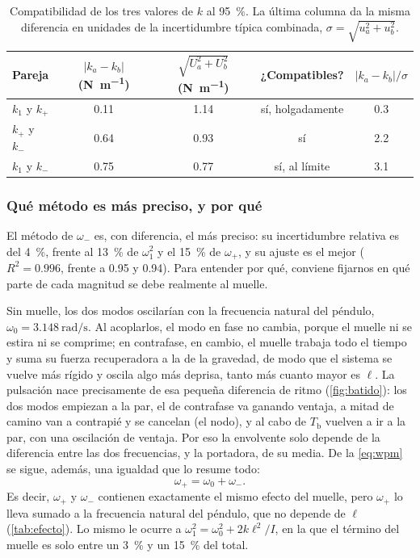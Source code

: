 \documentclass[a4paper,11pt]{amsart}
\numberwithin{equation}{section}
\newcommand{\Tb}{T_{\mathrm{b}}}              %
\newcommand{\wz}{\omega_0}                    %
\newcommand{\wu}{\omega_1}                    %
\newcommand{\wm}{\omega_{-}}                  %
\newcommand{\wpl}{\omega_{+}}                 %
\theoremstyle{cienplano}
\theoremstyle{ciendef}
\theoremstyle{cienobs}
\begin{document}
\begin{table}[ht]
\centering
\caption{Compatibilidad de los tres valores de $k$ al \SI{95}{\percent}. La
última columna da la misma diferencia en unidades de la incertidumbre típica
combinada, $\sigma=\sqrt{u_a^{2}+u_b^{2}}$.}
\label{tab:compatibilidad}
\renewcommand{\arraystretch}{1.25}
\begin{tabular}{@{}l c c c c@{}}
\toprule
Pareja & $|k_a-k_b|$ (\si{\newton\per\meter}) & $\sqrt{U_a^{2}+U_b^{2}}$ (\si{\newton\per\meter}) & ¿Compatibles? & $|k_a-k_b|/\sigma$ \\
\midrule
$k_{1}$ y $k_{+}$ & \num{0,11} & \num{1,14} & sí, holgadamente & \num{0,3} \\
$k_{+}$ y $k_{-}$ & \num{0,64} & \num{0,93} & sí              & \num{2,2} \\
$k_{1}$ y $k_{-}$ & \num{0,75} & \num{0,77} & sí, al límite    & \num{3,1} \\
\bottomrule
\end{tabular}
\end{table}

\subsubsection{Qué método es más preciso, y por qué}
El método de $\wm$ es, con diferencia, el más preciso: su incertidumbre
relativa es del \SI{4}{\percent}, frente al \SI{13}{\percent} de $\wu^{2}$ y el
\SI{15}{\percent} de $\wpl$, y su ajuste es el mejor ($R^{2}=\num{0,996}$,
frente a \num{0,95} y \num{0,94}). Para entender por qué, conviene fijarnos en
qué parte de cada magnitud se debe realmente al muelle.

Sin muelle, los dos modos oscilarían con la frecuencia natural del péndulo,
$\wz=\SI{3,148}{\radian\per\second}$. Al acoplarlos, el modo en fase no cambia,
porque el muelle ni se estira ni se comprime; en contrafase, en cambio, el
muelle trabaja todo el tiempo y suma su fuerza recuperadora a la de la
gravedad, de modo que el sistema se vuelve más rígido y oscila algo más
deprisa, tanto más cuanto mayor es $\ell$. La pulsación nace precisamente de
esa pequeña diferencia de ritmo (\cref{fig:batido}): los dos modos empiezan a
la par, el de contrafase va ganando ventaja, a mitad de camino van a contrapié
y se cancelan (el nodo), y al cabo de $\Tb$ vuelven a ir a la par, con una
oscilación de ventaja. Por eso la envolvente solo depende de la diferencia
entre las dos frecuencias, y la portadora, de su media. De la \cref{eq:wpm} se
sigue, además, una igualdad que lo resume todo:
\begin{equation}\label{eq:wmaswmenos}
  \wpl=\wz+\wm .
\end{equation}
Es decir, $\wpl$ y $\wm$ contienen exactamente el mismo efecto del muelle,
pero $\wpl$ lo lleva sumado a la frecuencia natural del péndulo, que no
depende de $\ell$ (\cref{tab:efecto}). Lo mismo le ocurre a
$\wu^{2}=\wz^{2}+2k\ell^{2}/I$, en la que el término del muelle es solo entre
un \SI{3}{\percent} y un \SI{15}{\percent} del total.
\end{document}

